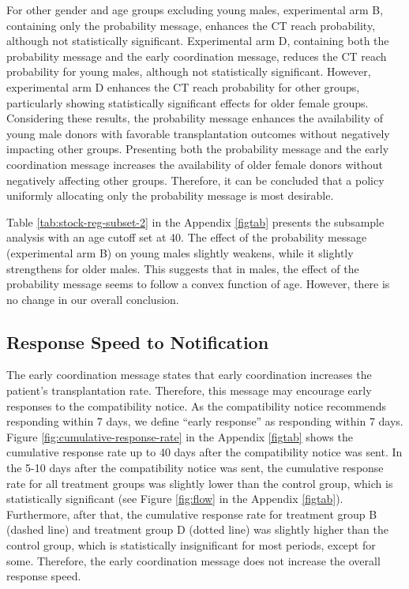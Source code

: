 \documentclass[12pt, a4paper]{article}
\begin{document}
For other gender and age groups excluding young males, experimental arm B, containing only the probability message, enhances the CT reach probability, although not statistically significant. Experimental arm D, containing both the probability message and the early coordination message, reduces the CT reach probability for young males, although not statistically significant. However, experimental arm D enhances the CT reach probability for other groups, particularly showing statistically significant effects for older female groups. Considering these results, the probability message enhances the availability of young male donors with favorable transplantation outcomes without negatively impacting other groups. Presenting both the probability message and the early coordination message increases the availability of older female donors without negatively affecting other groups. Therefore, it can be concluded that a policy uniformly allocating only the probability message is most desirable.

Table \ref{tab:stock-reg-subset-2} in the Appendix \ref{figtab} presents the subsample analysis with an age cutoff set at 40. The effect of the probability message (experimental arm B) on young males slightly weakens, while it slightly strengthens for older males. This suggests that in males, the effect of the probability message seems to follow a convex function of age. However, there is no change in our overall conclusion.

\hypertarget{reply-speed}{%
\subsection{Response Speed to Notification}\label{reply-speed}}

The early coordination message states that early coordination increases the patient's transplantation rate. Therefore, this message may encourage early responses to the compatibility notice. As the compatibility notice recommends responding within 7 days, we define ``early response'' as responding within 7 days. Figure \ref{fig:cumulative-response-rate} in the Appendix \ref{figtab} shows the cumulative response rate up to 40 days after the compatibility notice was sent. In the 5-10 days after the compatibility notice was sent, the cumulative response rate for all treatment groups was slightly lower than the control group, which is statistically significant (see Figure \ref{fig:flow} in the Appendix \ref{figtab}). Furthermore, after that, the cumulative response rate for treatment group B (dashed line) and treatment group D (dotted line) was slightly higher than the control group, which is statistically insignificant for most periods, except for some. Therefore, the early coordination message does not increase the overall response speed.
\end{document}
